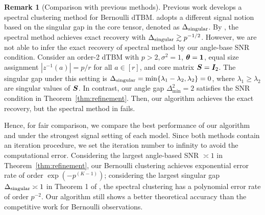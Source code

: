 \documentclass[journal]{IEEEtran}
\theoremstyle{definition}
\theoremstyle{definition}
\newtheorem{rmk}{Remark}
\begin{document}
\begin{itemize}[wide]
\begin{rmk}[Comparison with previous methods]  Previous work \citep{ke2019community} develops a spectral clustering method for Bernoulli dTBM. \cite{ke2019community} adopts a different signal notion based on the singular gap in the core tensor, denoted as $\Delta_{\rm singular}$. By \cite[Theorem 1]{ke2019community}, the spectral method achieves exact recovery with $\Delta_{\rm singular} \gtrsim p^{-1/2}$. However, we are not able to infer the exact recovery of spectral method by our angle-base SNR condition. Consider an order-2 dTBM with $p > 2, \sigma^2 = 1$, $\boldsymbol{\theta} = \mathbf{1}$, equal size assignment $|z^{-1}(a)| = p/r$ for all $ a \in [r]$, and core matrix $\bm S = \bm I_2$. The singular gap under this setting is $\Delta_{\rm singular} = \min\{ \lambda_1 - \lambda_2, \lambda_2 \} = 0$, where $\lambda_1 \geq \lambda_2$ are singular values of $\bm S$. In contrast, our angle gap $\Delta_{\min}^2 = 2$ satisfies the SNR condition in Theorem~\ref{thm:refinement}. Then, our algorithm achieves the exact recovery, but the spectral method in \cite{ke2019community} fails.

Hence, for fair comparison, we compare the best performance of our algorithm and \cite{ke2019community} under the strongest signal setting of each model. Since both methods contain an iteration procedure, we set the iteration number to infinity to avoid the computational error. Considering the largest angle-based SNR $\asymp 1$ in Theorem~\ref{thm:refinement}, our Bernoulli clustering achieves exponential error rate of order $\exp(-p^{(K-1)})$; considering the largest singular gap $\Delta_{\rm singular} \asymp 1$ in Theorem 1 of \cite{ke2019community}, the spectral clustering has a polynomial error rate of order $p^{-2}$. Our algorithm still shows a better theoretical accuracy than the competitive work for Bernoulli observations. 
\end{rmk}


\end{itemize}
\end{document}
